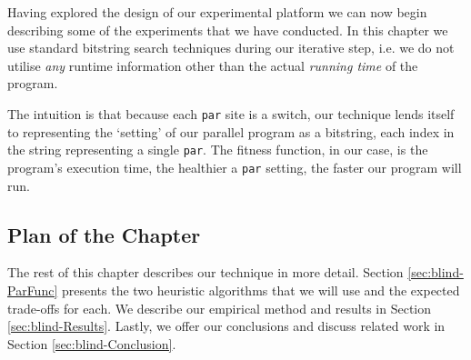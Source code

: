 Having explored the design of our experimental platform we can now begin
describing some of the experiments that we have conducted. In this chapter we
use standard bitstring search techniques during our iterative step, i.e. we do
not utilise \emph{any} runtime information other than the actual \emph{running
time} of the program.

The intuition is that because each \verb|par| site is a switch, our technique
lends itself to representing the `setting' of our parallel program as a
bitstring, each index in the string representing a single \verb|par|. The
fitness function, in our case, is the program's execution time, the healthier a
\verb|par| setting, the faster our program will run.

\subsection*{Plan of the Chapter}

The rest of this chapter describes our technique in more detail. Section
\ref{sec:blind-ParFunc} presents the two heuristic algorithms that we will use
and the expected trade-offs for each. We describe our empirical method and
results in Section \ref{sec:blind-Results}. Lastly, we offer our conclusions
and discuss related work in Section \ref{sec:blind-Conclusion}.
